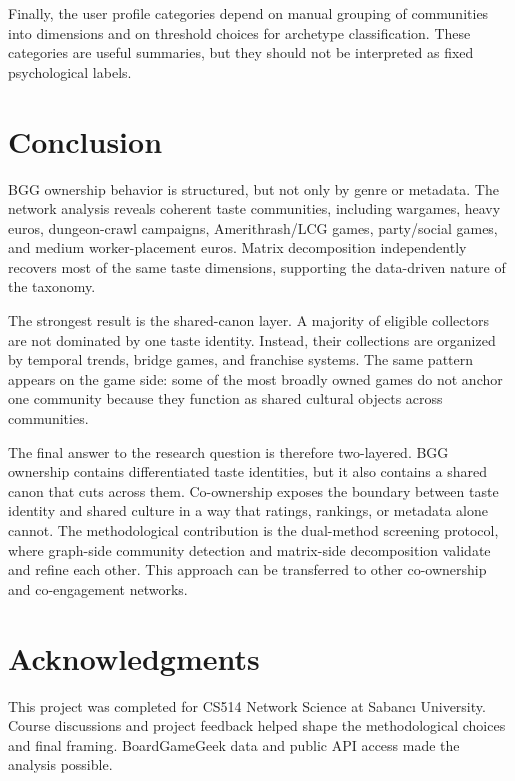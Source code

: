 \documentclass[10pt,twocolumn]{article}
\begin{document}
Finally, the user profile categories depend on manual grouping of communities into dimensions and on threshold choices for archetype classification. These categories are useful summaries, but they should not be interpreted as fixed psychological labels.

\section{Conclusion}

BGG ownership behavior is structured, but not only by genre or metadata. The network analysis reveals coherent taste communities, including wargames, heavy euros, dungeon-crawl campaigns, Amerithrash/LCG games, party/social games, and medium worker-placement euros. Matrix decomposition independently recovers most of the same taste dimensions, supporting the data-driven nature of the taxonomy.

The strongest result is the shared-canon layer. A majority of eligible collectors are not dominated by one taste identity. Instead, their collections are organized by temporal trends, bridge games, and franchise systems. The same pattern appears on the game side: some of the most broadly owned games do not anchor one community because they function as shared cultural objects across communities.

The final answer to the research question is therefore two-layered. BGG ownership contains differentiated taste identities, but it also contains a shared canon that cuts across them. Co-ownership exposes the boundary between taste identity and shared culture in a way that ratings, rankings, or metadata alone cannot. The methodological contribution is the dual-method screening protocol, where graph-side community detection and matrix-side decomposition validate and refine each other. This approach can be transferred to other co-ownership and co-engagement networks.

\balance

\section*{Acknowledgments}

This project was completed for CS514 Network Science at Sabanc\i{} University. Course discussions and project feedback helped shape the methodological choices and final framing. BoardGameGeek data and public API access made the analysis possible.
\end{document}
